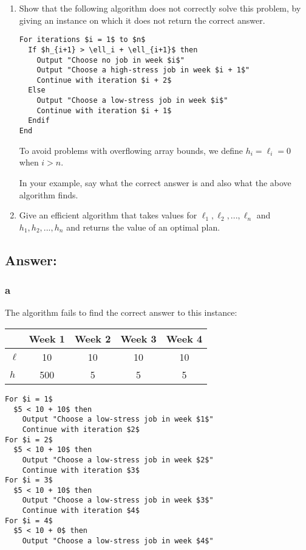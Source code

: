\documentclass[12pt, letterpaper]{article}
\newcommand{\grayrow}{\rowcolor[gray]{.8}}
\begin{document}
\renewcommand{\theenumi}{\alph{enumi}}
\begin{enumerate}
    \item Show that the following algorithm does not correctly solve this problem, by giving an instance on which it does not return the correct answer.
    
\begin{lstlisting}
For iterations $i = 1$ to $n$
  If $h_{i+1} > \ell_i + \ell_{i+1}$ then
    Output "Choose no job in week $i$"
    Output "Choose a high-stress job in week $i + 1$"
    Continue with iteration $i + 2$
  Else
    Output "Choose a low-stress job in week $i$"
    Continue with iteration $i + 1$
  Endif
End
\end{lstlisting}
    
    To avoid problems with overflowing array bounds, we define $h_i = \ell_i = 0$ when $i > n$.
    
    In your example, say what the correct answer is and also what the above algorithm finds.

    \item Give an efficient algorithm that takes values for $\ell_1, \ell_2, ... , \ell_n$ and $h_1, h_2, ..., h_n$ and returns the value of an optimal plan.
\end{enumerate}
\renewcommand{\theenumi}{\arabic{enumi}}


\clearpage
\subsection*{Answer:}
\subsubsection*{a}
The algorithm fails to find the correct answer to this instance:

\begin{table}[h!]
    \centering
    \begin{tabular}{lcccc}
        \hline
        \grayrow        & \textbf{Week 1} & \textbf{Week 2} & \textbf{Week 3} & \textbf{Week 4} \\
        \hline
        $\ell$      & 10  & 10 & 10 & 10 \\
        $h$         & 500 & 5 &  5 &  5 \\
        \hline
    \end{tabular}
\end{table}
\begin{lstlisting}
For $i = 1$
  $5 < 10 + 10$ then
    Output "Choose a low-stress job in week $1$"
    Continue with iteration $2$
For $i = 2$
  $5 < 10 + 10$ then
    Output "Choose a low-stress job in week $2$"
    Continue with iteration $3$
For $i = 3$
  $5 < 10 + 10$ then
    Output "Choose a low-stress job in week $3$"
    Continue with iteration $4$
For $i = 4$
  $5 < 10 + 0$ then
    Output "Choose a low-stress job in week $4$"
\end{lstlisting}
\end{document}
